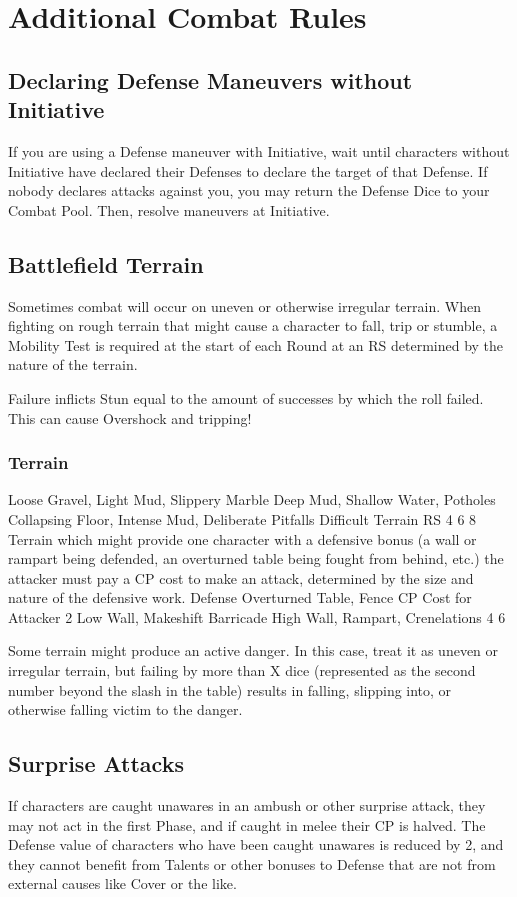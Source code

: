 \documentclass[oneside,11pt,english]{book}
\begin{document}
\section{Additional Combat Rules}
\subsection{Declaring Defense Maneuvers without Initiative}
If you are using a Defense maneuver with Initiative, wait until characters without Initiative have declared
their Defenses to declare the target of that Defense. If nobody declares attacks against you, you may
return the Defense Dice to your Combat Pool. Then, resolve maneuvers at Initiative.
\subsection{Battlefield Terrain}
Sometimes combat will occur on uneven or otherwise irregular terrain. When fighting on rough terrain that might cause a character to fall, trip or stumble, a Mobility Test is required at the start of each Round
at an RS determined by the nature of the terrain. 

Failure inflicts Stun equal to the amount of successes by which the roll failed. This can cause Overshock and tripping!
\subsubsection{Terrain} %
Loose Gravel, Light Mud, Slippery Marble
Deep Mud, Shallow Water, Potholes
Collapsing Floor, Intense Mud, Deliberate Pitfalls
Difficult Terrain RS
4
6
8
Terrain which might provide one character with a defensive bonus (a wall or rampart being defended, an
overturned table being fought from behind, etc.) the attacker must pay a CP cost to make an attack,
determined by the size and nature of the defensive work.
Defense
Overturned Table, Fence
CP Cost for Attacker
2
Low Wall, Makeshift Barricade
High Wall, Rampart, Crenelations
4
6

Some terrain might produce an active danger. In this case, treat it as uneven or irregular terrain, but failing by more than X dice (represented as the second number beyond the slash in the table) results in falling, slipping into, or otherwise falling victim to the danger.

\subsection{Surprise Attacks}
If characters are caught unawares in an ambush or other surprise attack, they may not act in the first Phase, and if caught in melee their CP is halved. The Defense value of characters who have been caught unawares is reduced by 2, and they cannot benefit from Talents or other bonuses to Defense that are not from external causes like Cover or the like. 
\end{document}
